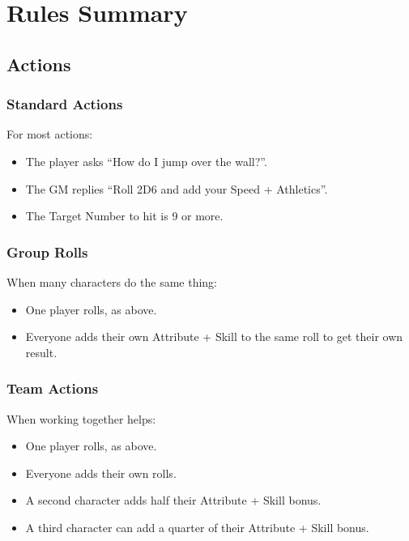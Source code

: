 \section*{Rules Summary}

\begin{multicols}{2}

\subsection{Actions}

\subsubsection{Standard Actions}

For most actions:

\begin{itemize}

\item{The player asks ``How do I jump over the wall?''.}
\item{The GM replies ``Roll 2D6 and add your Speed + Athletics''.}
\item{The Target Number to hit is 9 or more.}

\end{itemize}

\subsubsection{Group Rolls}

When many characters do the same thing:

\begin{itemize}

\item{One player rolls, as above.}
\item{Everyone adds their own Attribute + Skill to the same roll to get}
	their own result.

\end{itemize}

\subsubsection{Team Actions}

When working together helps:

\begin{itemize}

\item{One player rolls, as above.}
\item{Everyone adds their own rolls.}
\item{A second character adds half their Attribute + Skill bonus.}
\item{A third character can add a quarter of their Attribute + Skill bonus.}


\end{itemize}
\end{multicols}
